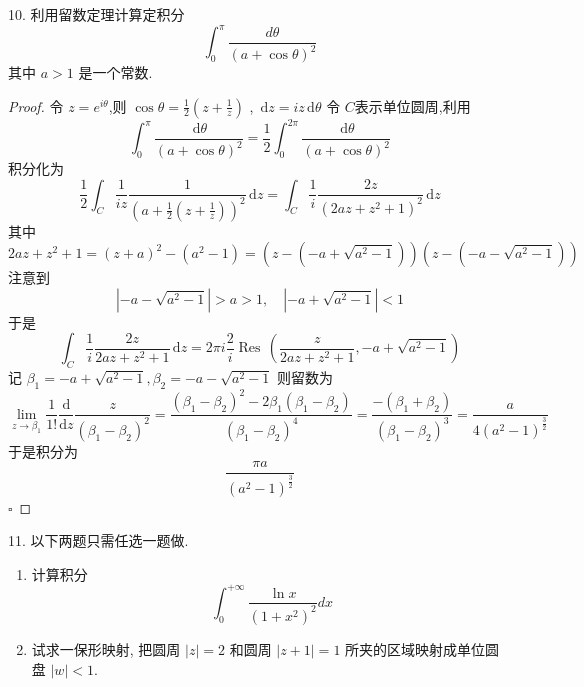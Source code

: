 \documentclass[../../复变函数.tex]{subfiles}
\begin{document}
\begin{problem}
10. 利用留数定理计算定积分
$$ \int_0^\pi \frac{d\theta}{(a+\cos\theta)^2} $$
其中 $a>1$ 是一个常数.
\end{problem}
\begin{proof}
    令 \(  z= e^{i \theta }  \),则 \(  \cos  \theta = \frac{1}{2}\left( z+ \frac{1 }{z }  \right)   \) , \(  \,\mathrm{d} z= iz\,\mathrm{d}  \theta   \)  令 \(  C \)表示单位圆周,利用 \[
    \int_{0}^{\pi }\frac{\,\mathrm{d}  \theta  }{\left( a+ \cos  \theta  \right)^{2}  }= \frac{1}{2}\int_{0}^{2\pi }\frac{\,\mathrm{d}  \theta  }{\left( a+ \cos  \theta  \right)^{2}  }  
    \]积分化为 \[
    \frac{1}{2}\int_{C}\frac{1 }{ iz}\frac{1 }{\left( a+ \frac{1}{2}\left( z+ \frac{1 }{z }  \right)  \right)^{2}  }  \,\mathrm{d} z= \int_{C} \frac{1 }{i }\frac{2z }{\left( 2az+ z^{2}+ 1 \right)^{2}  }  \,\mathrm{d} z
    \] 其中 \[
    2az+ z^{2}+ 1= \left( z+ a \right)^{2}-\left( a^{2}-1 \right)  =\left( z-\left( -a+ \sqrt{a^{2}-1} \right)  \right)\left( z-\left(- a-\sqrt{a^{2}-1} \right)  \right)  
    \]注意到 \[
    \left| -a-\sqrt{a^{2}-1} \right|> a> 1 ,\quad \left| -a+ \sqrt{a^{2}-1} \right| < 1
    \] 于是 \[
    \int_{C}\frac{1 }{i }\frac{2z }{2az+ z^{2}+ 1 }\,\mathrm{d} z=2\pi i \frac{2 }{i } \operatorname{Res}\,\left( \frac{z }{2az+ z^{2}+ 1 }, -a+ \sqrt{a^{2}-1}  \right)    
    \]记 \( \beta _1 = -a+ \sqrt{a^{2}-1}, \beta_2 = -a-\sqrt{a^{2}-1}  \) 则留数为 \[
    \lim_{z\to \beta_1} \frac{1 }{1! } \frac{\mathrm{d}}{\mathrm{d}z} \frac{z }{\left( \beta _1 -\beta _2  \right)^{2}  }=  \frac{\left( \beta _1 -\beta _2  \right)^{2}-2\beta _1 \left( \beta _1 -\beta _2  \right)   }{ \left( \beta _1 -\beta _2  \right)^{4} }   = \frac{-\left( \beta _1 + \beta _2  \right)  }{\left( \beta _1 -\beta _2  \right) ^{3} }= \frac{a }{4\left( a^{2}-1 \right)^{\frac{3}{2}} }  
    \]于是积分为   \[
    \frac{\pi a }{\left( a^{2}-1 \right)^{\frac{3}{2}}  } 
    \]
    \hfill $\square$
\end{proof}
\begin{problem}
11. 以下两题只需任选一题做.
\begin{enumerate}
    \item 计算积分
    $$ \int_0^{+\infty} \frac{\ln x}{(1+x^2)^2} dx $$
    \item 试求一保形映射, 把圆周 $|z|=2$ 和圆周 $|z+1|=1$ 所夹的区域映射成单位圆盘 $|w|<1$.
\end{enumerate}
\end{problem}
\end{document}
